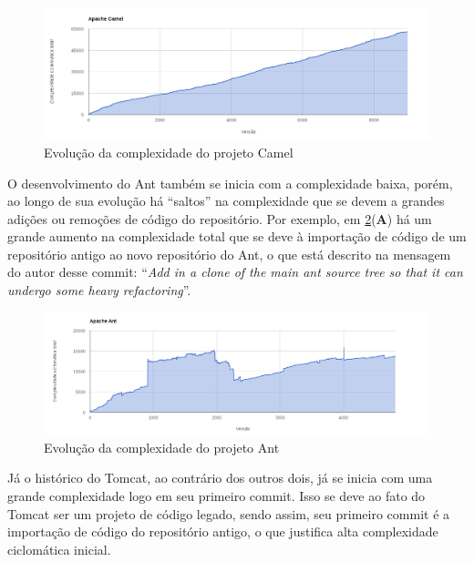 \documentclass[a4paper, 12pt, twoside]{book}
\begin{document}
        \begin{figure}[ht]
            \centering
            \includegraphics[width=20cm, angle=90]{img/graficos/camel.png}
            \caption{Evolução da complexidade do projeto Camel}
            \label{fig:cc-camel}
        \end{figure}

        O desenvolvimento do Ant também se inicia com a complexidade baixa, porém, ao longo de sua evolução há ``saltos'' na complexidade que se devem a grandes adições ou remoções de código do repositório. Por exemplo, em \ref{fig:cc-ant}(\textbf{A}) há um grande aumento na complexidade total que se deve à importação de código de um repositório antigo ao novo repositório do Ant, o que está descrito na mensagem  do autor desse commit: ``\textit{Add in a clone of the main ant source tree so that it can undergo some heavy refactoring}''.

        \begin{figure}[ht]
            \centering
            \includegraphics[width=20cm, angle=90]{img/graficos/ant.png}
            \caption{Evolução da complexidade do projeto Ant}
            \label{fig:cc-ant}
        \end{figure}

        Já o histórico do Tomcat, ao contrário dos outros dois, já se inicia com uma grande complexidade logo em seu primeiro commit. Isso se deve ao fato do Tomcat ser um projeto de código legado, sendo assim, seu primeiro commit é a importação de código do repositório antigo, o que justifica alta complexidade ciclomática inicial.
\end{document}

